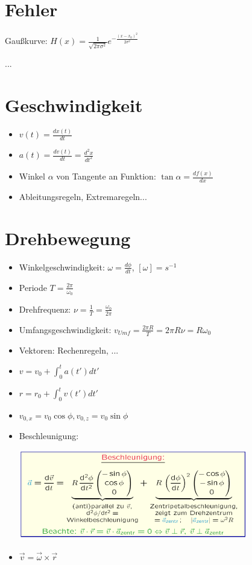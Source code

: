 \documentclass[a4paper,10pt, fleqn]{article}
\begin{document}
\section{Fehler}
\label{sec:fehler}


Gaußkurve: $H(x) = \frac{1}{\sqrt{2\pi\sigma^{2}}}e^{-\frac{(x-x_{0})^{2}}{2\sigma^{2}}}$

...

\section{Geschwindigkeit}
\label{sec:geschwindigkeit}
\begin{itemize}
\item $v(t) = \frac{dx(t)}{dt}$
\item $a(t) = \frac{dv(t)}{dt} = \frac{d^{2}x}{dt^{2}}$
\item Winkel $\alpha$
  von Tangente an Funktion: $\tan\alpha = \frac{df(x)}{dx}$

\item Ableitungsregeln, Extremaregeln...
\end{itemize}

\section{Drehbewegung}
\label{sec:drehbewegung}
\begin{itemize}
\item Winkelgeschwindigkeit: $\omega = \frac{d\phi}{dt}$, $[\omega] = s^{-1}$
\item Periode $T = \frac{2\pi}{\omega_{0}}$
\item Drehfrequenz: $\nu = \frac{1}{T} = \frac{\omega_0}{2\pi}$
\item Umfangsgeschwindigkeit: $v_{Umf} = \frac{2\pi R}{T} = 2\pi R\nu = R \omega_0$
\item Vektoren: Rechenregeln, ...
\item $v = v_0 + \int_0^ta(t')dt'$
\item $r = r_0 + \int_0^tv(t')dt'$
\item $v_{0,x} = v_0\cos \phi, v_{0, z} = v_0 \sin \phi$
\item Beschleunigung:

\includegraphics[width=10cm]{Beschleunigung}
\item $\vec{v} = \vec{\omega} \times \vec{r}$
\end{itemize}
\end{document}
